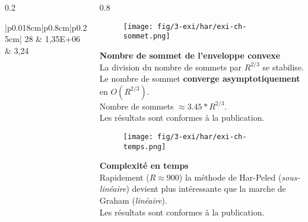 \begin{frame}
\begin{columns}[t]
\begin{column}{0.2\linewidth}
\begin{tiny}
\begin{table}[H]
\begin{tabular}{|p{0.018cm}|p{0.8cm}|p{0.25cm}|}
          28 & 1,35E+06  & 3,24\\
          \hline
        \end{tabular} 
        \label{tab:ch} 
      \end{table}
    \end{tiny}
  \end{column}
  \begin{column}{0.8\linewidth}
    \vspace{-0.6cm}
    {
      \begin{figure}[H]
        \centering
        \texttt{[image: fig/3-exi/har/exi-ch-sommet.png]}       
      \end{figure}
      \vspace{-0.3cm}
      \begin{exampleblock}{}
       \textbf{Nombre de sommet de l'enveloppe convexe}\\
        La division du nombre de sommets par $R^{2/3}$ se stabilise.\\
        Le nombre de sommet \textbf{converge asymptotiquement} en $O(R^{2/3})$. \\
        Nombre de sommets $ \approx 3.45 * R^{2/3}$.\\
        Les résultats sont conformes à la publication. \\

     \end{exampleblock}
    }
    
    {
      \begin{figure}[H]
        \centering
        \texttt{[image: fig/3-exi/har/exi-ch-temps.png]}
      \end{figure}
      \vspace{-0.3cm}
      \begin{exampleblock}{}
        \textbf{Complexité en temps}\\
        Rapidement  ($R \approx 900$) la méthode de Har-Peled (\textit{sous-linéaire}) devient plus intéressante que la marche de Graham (\textit{linéaire}).\\
        Les résultats sont conformes à la publication.
      \end{exampleblock}
    }
       
  \end{column}  
\end{columns}
\end{frame}
